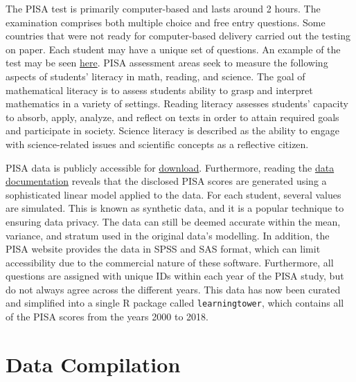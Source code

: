 The PISA test is primarily computer-based and lasts around 2 hours. The
examination comprises both multiple choice and free entry questions.
Some countries that were not ready for computer-based delivery carried
out the testing on paper. Each student may have a unique set of
questions. An example of the test may be seen
\href{https://www.oecd.org/pisa/test/}{here}. PISA assessment areas seek
to measure the following aspects of students' literacy in math, reading,
and science. The goal of mathematical literacy is to assess students
ability to grasp and interpret mathematics in a variety of settings.
Reading literacy assesses students' capacity to absorb, apply, analyze,
and reflect on texts in order to attain required goals and participate
in society. Science literacy is described as the ability to engage with
science-related issues and scientific concepts as a reflective citizen.
\citep{test}

PISA data is publicly accessible for
\href{https://www.oecd.org/pisa/data/}{download}. Furthermore, reading
the
\href{https://www.oecd.org/pisa/data/pisa2018technicalreport/Ch.09-Scaling-PISA-Data.pdf}{data
documentation} reveals that the disclosed PISA scores are generated
using a sophisticated linear model applied to the data. For each
student, several values are simulated. \citep{scaling} This is known as
synthetic data, and it is a popular technique to ensuring data privacy.
The data can still be deemed accurate within the mean, variance, and
stratum used in the original data's modelling. In addition, the PISA
website provides the data in SPSS and SAS format, which can limit
accessibility due to the commercial nature of these software.
Furthermore, all questions are assigned with unique IDs within each year
of the PISA study, but do not always agree across the different years.
This data has now been curated and simplified into a single R package
called \texttt{learningtower}, which contains all of the PISA scores
from the years 2000 to 2018.

\hypertarget{data-compilation}{%
\section{Data Compilation}\label{data-compilation}}

